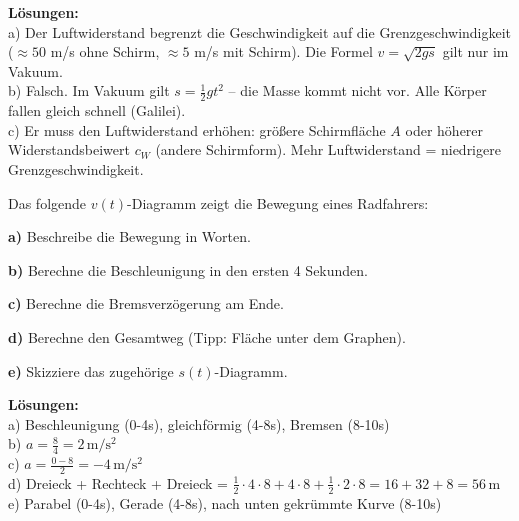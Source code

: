 \documentclass[11pt,a4paper]{article}
\begin{document}
\textbf{Lösungen:}\\
a) Der Luftwiderstand begrenzt die Geschwindigkeit auf die Grenzgeschwindigkeit ($\approx 50$ m/s ohne Schirm, $\approx 5$ m/s mit Schirm). Die Formel $v = \sqrt{2gs}$ gilt nur im Vakuum.\\
b) Falsch. Im Vakuum gilt $s = \frac{1}{2}gt^2$ -- die Masse kommt nicht vor. Alle Körper fallen gleich schnell (Galilei).\\
c) Er muss den Luftwiderstand erhöhen: größere Schirmfläche $A$ oder höherer Widerstandsbeiwert $c_W$ (andere Schirmform). Mehr Luftwiderstand = niedrigere Grenzgeschwindigkeit.

\vspace{0.5cm}

\begin{aufgabe}
Das folgende $v(t)$-Diagramm zeigt die Bewegung eines Radfahrers:

\begin{center}
\end{center}

\textbf{a)} Beschreibe die Bewegung in Worten.

\textbf{b)} Berechne die Beschleunigung in den ersten 4 Sekunden.

\textbf{c)} Berechne die Bremsverzögerung am Ende.

\textbf{d)} Berechne den Gesamtweg (Tipp: Fläche unter dem Graphen).

\textbf{e)} Skizziere das zugehörige $s(t)$-Diagramm.
\end{aufgabe}

\textbf{Lösungen:}\\
a) Beschleunigung (0-4s), gleichförmig (4-8s), Bremsen (8-10s)\\
b) $a = \frac{8}{4} = 2\,\mathrm{m/s^2}$\\
c) $a = \frac{0-8}{2} = -4\,\mathrm{m/s^2}$\\
d) Dreieck + Rechteck + Dreieck = $\frac{1}{2} \cdot 4 \cdot 8 + 4 \cdot 8 + \frac{1}{2} \cdot 2 \cdot 8 = 16 + 32 + 8 = 56\,\mathrm{m}$\\
e) Parabel (0-4s), Gerade (4-8s), nach unten gekrümmte Kurve (8-10s)
\end{document}

